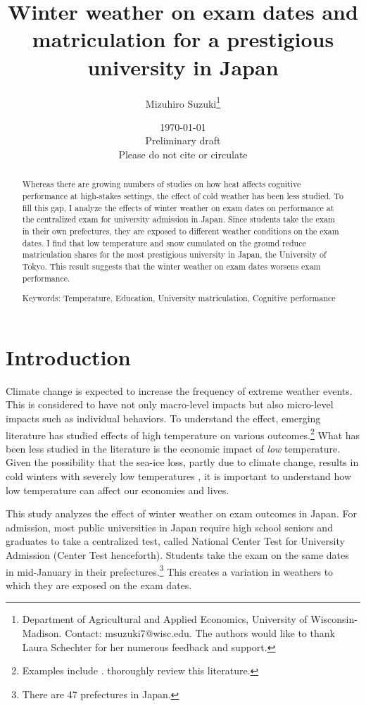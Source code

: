 \documentclass[12pt,letterpaper]{article}
\title{Winter weather on exam dates and matriculation for a prestigious university in Japan}%
\author{Mizuhiro Suzuki\thanks{Department of Agricultural and Applied Economics, University of Wisconsin-Madison. Contact: msuzuki7@wisc.edu. The authors would like to thank Laura Schechter for her numerous feedback and support.}}
\date{\today \\ \vspace{1cm} Preliminary draft \\ Please do not cite or circulate}
\begin{document}
  
\maketitle
\begin{abstract}
  \singlespacing
    \noindent 
    Whereas there are growing numbers of studies on how heat affects cognitive performance at high-stakes settings, the effect of cold weather has been less studied.
    To fill this gap, I analyze the effects of winter weather on exam dates on performance at the centralized exam for university admission in Japan.
    Since students take the exam in their own prefectures, they are exposed to different weather conditions on the exam dates. 
    I find that low temperature and snow cumulated on the ground reduce matriculation shares for the most prestigious university in Japan, the University of Tokyo.
    This result suggests that the winter weather on exam dates worsens exam performance. 

  \medskip
  \vspace{1cm}
  \noindent Keywords: Temperature, Education, University matriculation, Cognitive performance
\end{abstract}

\newpage

\section{Introduction}

Climate change is expected to increase the frequency of extreme weather events.
This is considered to have not only macro-level impacts but also micro-level impacts such as individual behaviors.
To understand the effect, emerging literature has studied effects of high temperature on various outcomes.\footnote{
  Examples include \citet{Dell2012, Burke2015, Heyes2019, Garg2020, Geruso2018, Park2020a, Park2020b, GraffZivi2018, GraffZivin2014}.
  \citet{Carleton2016} thoroughly review this literature.
}
What has been less studied in the literature is the economic impact of \textit{low} temperature.
Given the possibility that the sea-ice loss, partly due to climate change, results in cold winters with severely low temperatures \citep{Kretschmer2016, Kim2014}, it is important to understand how low temperature can affect our economies and lives.

This study analyzes the effect of winter weather on exam outcomes in Japan.
For admission, most public universities in Japan require high school seniors and graduates to take a centralized test, called National Center Test for University Admission (Center Test henceforth).
Students take the exam on the same dates in mid-January in their prefectures.\footnote{
  There are 47 prefectures in Japan.
}
This creates a variation in weathers to which they are exposed on the exam dates.
\end{document}
